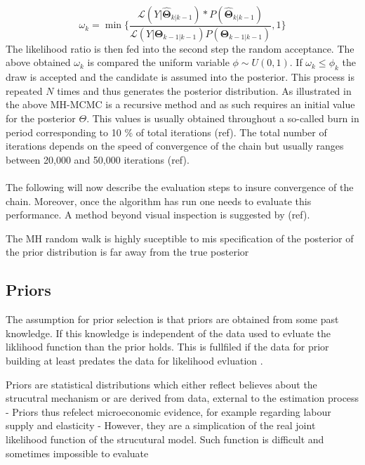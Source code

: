 \documentclass[12pt,a4paper,english]{article} %
\newcommand{\matr}[1]{\mathbf{#1}} %
\newcommand{\Lagr}{\mathcal{L}} %
\begin{document}
	\[
	\omega_k = \min \{
						\frac{ \Lagr(Y| \matr{\hat{\Theta}}_{k|k-1}) * P(\matr{\hat{\Theta}}_{k|k-1}) } 
						{ \Lagr(Y| \matr{\Theta}_{k-1|k-1}) P(\matr{\Theta}_{k-1|k-1})},
						 1
					\}
	\]
	The likelihood ratio is then fed into the second step the random acceptance. The above obtained $\omega_k$ is compared the uniform variable $\phi \sim U(0, 1)$. If $\omega_k \leq \phi_k$ the draw is accepted and the candidate is assumed into the posterior. This process is repeated $N$ times and thus generates the posterior distribution.
	As illustrated in the above MH-MCMC is a recursive method and as such requires an initial value for the posterior $\Theta$. This values is usually obtained throughout a so-called burn in period corresponding to 10 \% of total iterations (ref). The total number of iterations depends on the speed of convergence of the chain but usually ranges between 20,000 and 50,000 iterations (ref).\\
	\\
	The following will now describe the evaluation steps to insure convergence of the chain. Moreover, once the algorithm has run one needs to evaluate this performance. A method beyond visual inspection is suggested by (ref).
	
	The MH random walk is highly suceptible to mis specification of the posterior of the prior distribution is far away from the true posterior \cite{herbst_bayesian_2016}
			
	\subsection{Priors}
	
	The assumption for prior selection is that priors are obtained from some past knowledge. If this knowledge is independent of the data used to evluate the liklihood function than the prior holds. This is fullfiled if the data for prior building at least predates the data for likelihood evluation \cite{herbst_bayesian_2016}.
		
	Priors are statistical distributions which either reflect believes about the strucutral mechanism or are derived from data, external to the estimation process \cite{del_negro_forming_2008}
	- Priors thus refelect microeconomic evidence, for example regarding labour supply and elasticity
	- However, they are a simplication of the real joint likelihood function of the strucutural model. Such function is difficult and sometimes impossible to evaluate
	
\end{document}
